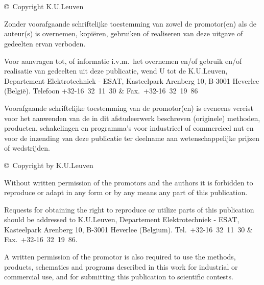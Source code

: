 \section*{}
\thispagestyle{empty}

\vfill

\copyright~Copyright K.U.Leuven

\bigskip \noindent Zonder voorafgaande schriftelijke toestemming van zowel de promotor(en) als de auteur(s) is overnemen, kopi\"eren, gebruiken of realiseren van deze uitgave of gedeelten ervan verboden. 

\medskip \noindent Voor aanvragen tot, of informatie i.v.m.\ het overnemen en/of gebruik en/of realisatie van gedeelten uit deze publicatie, wend U tot de K.U.Leuven, Departement Elektrotechniek - ESAT, Kasteelpark Arenberg 10, B-3001 Heverlee (Belgi\"e). Telefoon +32-16~32~11~30 \& Fax.\ +32-16~32~19~86

\medskip \noindent Voorafgaande schriftelijke toestemming van de promotor(en) is eveneens vereist voor het aanwenden van de in dit afstudeerwerk beschreven (originele) methoden, producten, schakelingen en programma's voor industrieel of commercieel nut en voor de inzending van deze publicatie ter deelname aan wetenschappelijke prijzen of wedstrijden.

\bigskip
\bigskip
\bigskip

\noindent \copyright~Copyright by K.U.Leuven

\bigskip \noindent Without written permission of the promotors and the authors it is forbidden to reproduce or adapt in any form or by any means any part of this publication. 

\medskip \noindent Requests for obtaining the right to reproduce or utilize parts of this publication should be addressed to K.U.Leuven, Departement Elektrotechniek - ESAT, Kasteelpark Arenberg 10,  B‑3001 Heverlee  (Belgium). Tel.\ +32-16~32~11~30 \& Fax.\ +32-16~32~19~86.

\medskip \noindent A written permission of the promotor is also required to use the methods, products, schematics and programs described in this work for industrial or commercial use, and for submitting this publication to scientific contests.

\clearpage
